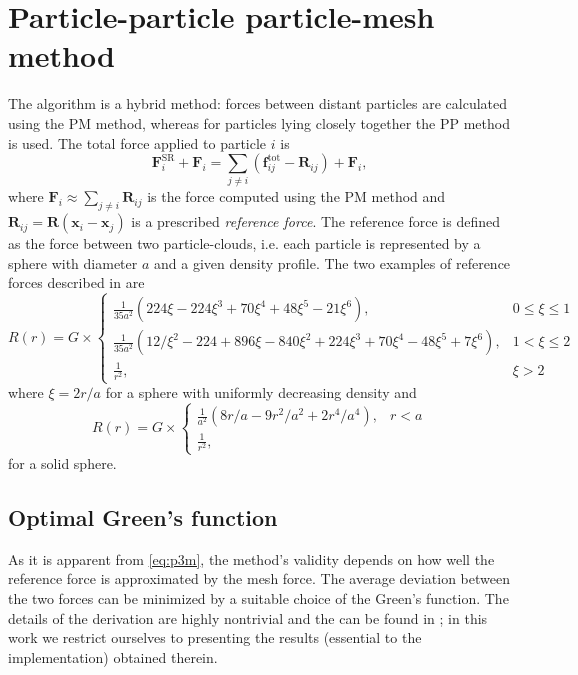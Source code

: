 \section{Particle-particle particle-mesh method}
The \PThreeM{} algorithm is a hybrid method:
forces between distant particles are calculated using the PM method, whereas for particles lying closely together the PP method is used.
The total force applied to particle $i$ is
\begin{equation}\label{eq:p3m}
    \mathbf{F}_i^\text{SR} + \mathbf{F}_i = \sum_{j \neq i}(\mathbf{f}_{ij}^\text{tot} - \mathbf{R}_{ij}) + \mathbf{F}_i,
\end{equation}
where $\mathbf{F}_i \approx \sum_{j\neq i} \mathbf{R}_{ij}$ is the force computed using the PM method and $\mathbf{R}_{ij} = \mathbf{R}(\mathbf{x}_i - \mathbf{x}_j)$ is a prescribed \textit{reference force}.
The reference force is defined as the force between two particle-clouds, i.e. each particle is represented by a sphere with diameter $a$ and a given density profile.
The two examples of reference forces described in \cite{Hockney1988} are
\begin{equation*}
    R(r) =
    G\times\begin{cases}
        \frac{1}{35  a^2}  (224  \xi - 224  \xi^3 + 70  \xi^4 + 48  \xi^5 - 21  \xi^6),                                & 0 \leq \xi \leq 1 \\
        \frac{1}{35  a^2}  (12 / \xi^2 - 224 + 896  \xi - 840  \xi^2 + 224  \xi^3 + 70  \xi^4 - 48  \xi^5 + 7  \xi^6), & 1 < \xi \leq 2    \\
        \frac{1}{r^2},                                                                                                 & \xi > 2
    \end{cases}
\end{equation*}
where $\xi = 2r/a$ for a sphere with uniformly decreasing density and
\begin{equation*}
    R(r) =
    G\times\begin{cases}
        \frac{1}{a^2}  (8  r / a - 9  r^2 / a^2 + 2  r^4 / a^4), & r < a \\
        \frac{1}{r^2},
    \end{cases}
\end{equation*}
for a solid sphere.

\subsection{Optimal Green's function}
As it is apparent from \autoref{eq:p3m}, the method's validity depends on how well the reference force is approximated by the mesh force.
The average deviation between the two forces can be minimized by a suitable choice of the Green's function.
The details of the derivation are highly nontrivial and the can be found in \cite{Hockney1988};
in this work we restrict ourselves to presenting the results (essential to the implementation) obtained therein.

